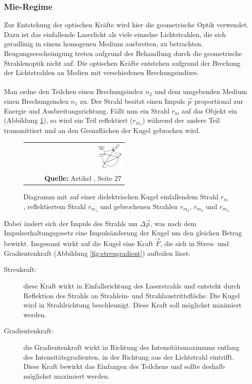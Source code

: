 \documentclass[a4paper,titlepage]{scrartcl}
\numberwithin{equation}{section}
\begin{document}
\subsubsection{Mie-Regime}
Zur Entstehung der optischen Kräfte wird hier die geometrische Optik verwendet. Dazu ist das einfallende Laserlicht als viele einzelne Lichtstrahlen, die sich geradlinig in einem homogenen Medium ausbreiten, zu betrachten. Beugungserscheinigung treten aufgrund der Behandlung durch die geometrische Strahlenoptik nicht auf. Die optischen Kräfte entstehen aufgrund der Brechung der Lichtstrahlen an Medien mit verschiedenen Brechungsindizes.\\ \\
Man ordne den Teilchen einen Brechungsindex $n_2$ und dem umgebenden Medium einen Brechungsindex $n_1$ zu. Der Strahl besitzt einen Impuls $\vec{p}$ proportional zur Energie und Ausbreitungsrichtung. Fällt nun ein Strahl $r_m$ auf das Objekt ein (Abbildung \ref{fig:strahlen}), so wird ein Teil reflektiert ($r_{m_1}$) während der andere Teil transmittiert und an den Grenzflächen der Kugel gebrochen wird.
\begin{figure}[H]
	\centering
	\begin{tabular}{@{}r@{}}
		\includegraphics[width=0.25\textwidth]{images/strahlen.PNG}\\
		\footnotesize\sffamily\textbf{Quelle:} Artikel \cite{smith1999}, Seite 27
	\end{tabular}
	\caption{Diagramm mit auf einer dielektrischen Kugel einfallendem Strahl $r_m$, reflektiertem Strahl $r_{m_1}$ und gebrochenen Strahlen $r_{m_2}$, $r_{m_3}$ und $r_{m_4}$}
    \label{fig:strahlen}
\end{figure}
Dabei ändert sich der Impuls des Strahls um $\Delta \vec{p}$, was nach dem Impulserhaltungsgesetz eine Impulsänderung der Kugel um den gleichen Betrag bewirkt. Insgesamt wirkt auf die Kugel eine Kraft $\vec{F}$, die sich in Streu- und Gradientenkraft (Abbildung \ref{fig:streugradient}) aufteilen lässt:
\begin{description}
\item[Streukraft:] diese Kraft wirkt in Einfallsrichtung des Laserstrahls und entsteht durch Reflektion des Strahls an Strahlein- und Strahlaustrittsfläche. Die Kugel wird in Strahlrichtung beschleunigt. Diese Kraft soll möglichst minimiert werden.
\item[Gradientenkraft:] die Gradientenkraft wirkt in Richtung des Intensitätsmaximums entlang des Intensitätsgradienten, in der Richtung aus der Lichtstrahl eintrifft. Diese Kraft bewirkt das Einfangen des Teilchens und sollte deshalb möglichst maximiert werden.
\end{description}
\end{document}
